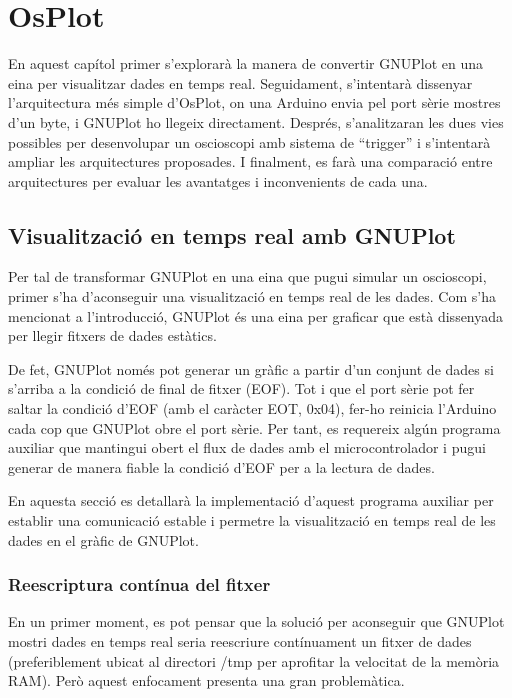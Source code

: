 \documentclass{tfgitic}[2023/06/30]
\begin{document}
\chapter{OsPlot}

En aquest capítol primer s'explorarà la manera de convertir GNUPlot en
una eina per visualitzar dades en temps real. Seguidament, s'intentarà
dissenyar l'arquitectura més simple d'OsPlot, on una Arduino envia pel
port sèrie mostres d'un byte, i GNUPlot ho llegeix directament.
Després, s'analitzaran les dues vies possibles per desenvolupar un
osci\lgem oscopi amb sistema de ``trigger'' i s'intentarà ampliar les
arquitectures proposades. I finalment, es farà una comparació entre
arquitectures per evaluar les avantatges i inconvenients de cada una.

\section{Visualització en temps real amb GNUPlot}

Per tal de transformar GNUPlot en una eina que pugui simular un
osci\lgem oscopi, primer s'ha d'aconseguir una visualització en temps
real de les dades. Com s'ha mencionat a l'introducció, GNUPlot és una
eina per graficar que està dissenyada per llegir fitxers de dades
estàtics.

De fet, GNUPlot només pot generar un gràfic a partir d'un conjunt de
dades si s'arriba a la condició de final de fitxer (EOF). Tot i que el
port sèrie pot fer saltar la condició d'EOF (amb el caràcter EOT,
0x04), fer-ho reinicia l'Arduino cada cop que GNUPlot obre el port
sèrie. Per tant, es requereix algún programa auxiliar que mantingui
obert el flux de dades amb el microcontrolador i pugui generar de
manera fiable la condició d'EOF per a la lectura de dades.

En aquesta secció es detallarà la implementació d'aquest programa
auxiliar per establir una comunicació estable i permetre la
visualització en temps real de les dades en el gràfic de GNUPlot.

\subsection{Reescriptura contínua del fitxer}

En un primer moment, es pot pensar que la solució per aconseguir que
GNUPlot mostri dades en temps real seria reescriure contínuament un
fitxer de dades (preferiblement ubicat al directori /tmp per aprofitar
la velocitat de la memòria RAM). Però aquest enfocament presenta una
gran problemàtica.
\end{document}
